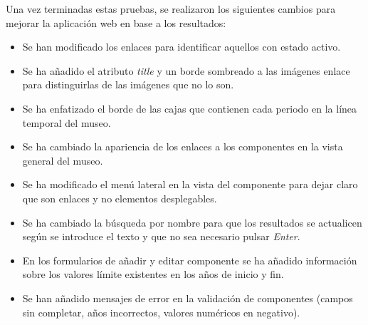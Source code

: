Una vez terminadas estas pruebas, se realizaron los siguientes cambios para mejorar la aplicación web en base a los resultados:
\begin{itemize}
\item Se han modificado los enlaces para identificar aquellos con estado activo.
\item Se ha añadido el atributo \textit{title} y un borde sombreado a las imágenes enlace para distinguirlas de las imágenes que no lo son.
\item Se ha enfatizado el borde de las cajas que contienen cada periodo en la línea temporal del museo.
\item Se ha cambiado la apariencia de los enlaces a los componentes en la vista general del museo.
\item Se ha modificado el menú lateral en la vista del componente para dejar claro que son enlaces y no elementos desplegables.
\item Se ha cambiado la búsqueda por nombre para que los resultados se actualicen según se introduce el texto y que no sea necesario pulsar \textit{Enter}.
\item En los formularios de añadir y editar componente se ha añadido información sobre los valores límite existentes en los años de inicio y fin.
\item Se han añadido mensajes de error en la validación de componentes (campos sin completar, años incorrectos, valores numéricos en negativo).
\end{itemize}